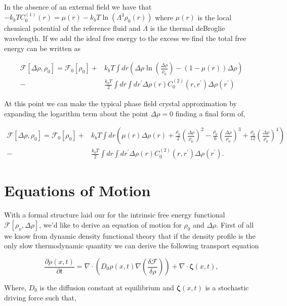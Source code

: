 \documentclass[11pt]{article}
\begin{document}
In the absence of an external field we have that $-k_bTC^{(1)}_0(r) = \mu(r) - k_bT \ln(\Lambda^3\rho_0(r))$ where $\mu(r)$ is the local chemical potential of the reference fluid and $\Lambda$ is the thermal deBroglie wavelength. If we add the ideal free energy to the excess we find the total free energy can be written as

\begin{align}
\mathcal{F}[\Delta \rho, \rho_0] = \mathcal{F}_0[\rho_0] + &k_bT \int dr\left( \Delta\rho \ln\left(\frac{\Delta \rho}{\rho_0}\right) - (1-\mu(r))\Delta \rho\right) \nonumber \\
- &\frac{k_bT}{2} \int dr \int dr^\prime \Delta \rho(r) C^{(2)}_0(r, r^\prime) \Delta \rho(r^\prime)
\end{align} 

At this point we can make the typical phase field crystal approximation by expanding the logarithm term about the point $\Delta \rho = 0$ finding a final form of,

\begin{align}
\mathcal{F}[\Delta \rho, \rho_0] = \mathcal{F}_0[\rho_0] + &k_bT \int dr\left(\mu(r)\Delta\rho(r) + \frac{\rho_0}{2}\left(\frac{\Delta \rho}{\rho_0}\right)^2 - \frac{\rho_0}{6}\left(\frac{\Delta \rho}{\rho_0}\right)^3 + \frac{\rho_0}{12}\left(\frac{\Delta \rho}{\rho_0}\right)^4	\right)   \nonumber \\
- &\frac{k_bT}{2} \int dr \int dr^\prime \Delta \rho(r) C^{(2)}_0(r, r^\prime) \Delta \rho(r^\prime).
\end{align} 


\section{Equations of Motion}

With a formal structure laid our for the intrinsic free energy functional $\mathcal{F}[\rho_o, \Delta\rho]$, we'd like to derive an equation of motion for $\rho_0$ and $\Delta\rho$. First of all we know from dynamic density functional theory that if the density profile is the only slow thermodynamic quantity we can derive the following transport equation

\begin{equation}
\frac{\partial \rho(x, t)}{\partial t} = \nabla \cdot \left(D_0 \rho(x, t) \nabla \left(\frac{\delta \mathcal{F}}{\delta \rho}\right)\right) +\nabla \cdot \boldsymbol{\zeta}(x, t),
\end{equation}

Where, $D_0$ is the diffusion constant at equilibrium and $\boldsymbol{\zeta}(x, t)$ is a stochastic driving force such that, 
\end{document}
